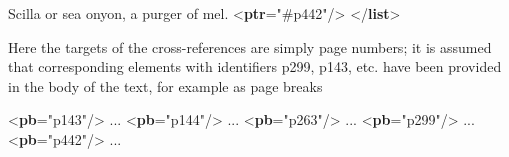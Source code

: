 \begin{shaded}
\mbox{}\newline 
{}Scilla or sea onyon, a purger of mel. {<\textbf{ptr}\hspace*{1em}{target}="{\#p442}"/>}\mbox{}\newline 
{}\mbox{}\newline 
{</\textbf{list}>}\end{shaded}\egroup\par \noindent  Here the targets of the cross-references are simply page numbers; it is assumed that corresponding elements with identifiers \textsf{p299}, \textsf{p143}, etc. have been provided in the body of the text, for example as page breaks \par\bgroup{}\exampleFont \begin{shaded}\noindent\mbox{}{<\textbf{pb}\hspace*{1em}{xml:id}="{p143}"/>}\mbox{}\newline 
 ...\mbox{}\newline 
{<\textbf{pb}\hspace*{1em}{xml:id}="{p144}"/>}\mbox{}\newline 
 ...\mbox{}\newline 
{<\textbf{pb}\hspace*{1em}{xml:id}="{p263}"/>}\mbox{}\newline 
 ...\mbox{}\newline 
{<\textbf{pb}\hspace*{1em}{xml:id}="{p299}"/>}\mbox{}\newline 
 ...\mbox{}\newline 
{<\textbf{pb}\hspace*{1em}{xml:id}="{p442}"/>}\mbox{}\newline 
 ...\mbox{}\newline 
\end{shaded}\egroup\par \par

